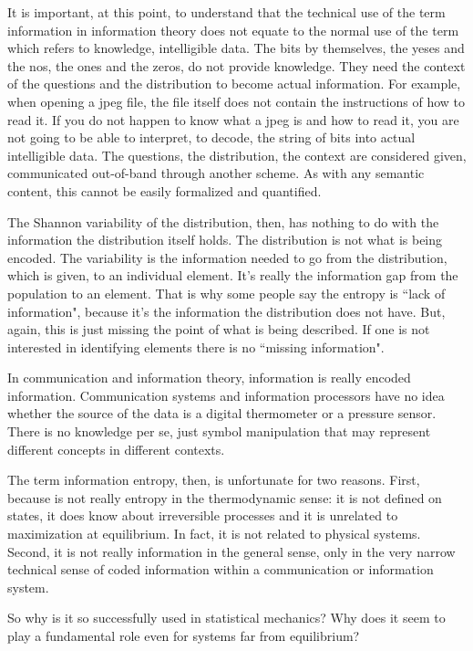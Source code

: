 \documentclass{article}
\begin{document}
It is important, at this point, to understand that the technical use of the term information in information theory does not equate to the normal use of the term which refers to knowledge, intelligible data. The bits by themselves, the yeses and the nos, the ones and the zeros, do not provide knowledge. They need the context of the questions and the distribution to become actual information. For example, when opening a jpeg file, the file itself does not contain the instructions of how to read it. If you do not happen to know what a jpeg is and how to read it, you are not going to be able to interpret, to decode, the string of bits into actual intelligible data. The questions, the distribution, the context are considered given, communicated out-of-band through another scheme. As with any semantic content, this cannot be easily formalized and quantified.

The Shannon variability of the distribution, then, has nothing to do with the information the distribution itself holds. The distribution is not what is being encoded. The variability is the information needed to go from the distribution, which is given, to an individual element. It's really the information gap from the population to an element. That is why some people say the entropy is ``lack of information", because it's the information the distribution does not have. But, again, this is just missing the point of what is being described. If one is not interested in identifying elements there is no ``missing information".

In communication and information theory, information is really encoded information. Communication systems and information processors have no idea whether the source of the data is a digital thermometer or a pressure sensor. There is no knowledge per se, just symbol manipulation that may represent different concepts in different contexts.

The term information entropy, then, is unfortunate for two reasons. First, because is not really entropy in the thermodynamic sense: it is not defined on states, it does know about irreversible processes and it is unrelated to maximization at equilibrium. In fact, it is not related to physical systems. Second, it is not really information in the general sense, only in the very narrow technical sense of coded information within a communication or information system.

So why is it so successfully used in statistical mechanics? Why does it seem to play a fundamental role even for systems far from equilibrium?
\end{document}
